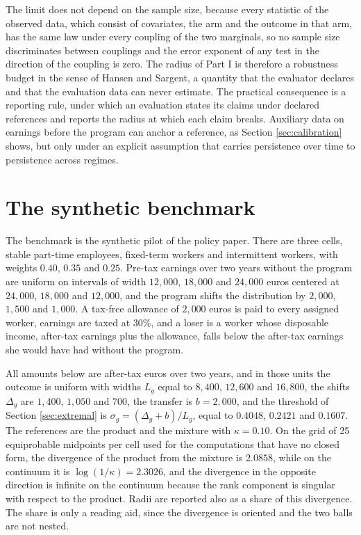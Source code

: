 \documentclass[11pt,a4paper]{article}
\theoremstyle{notesplain}
\theoremstyle{notesupright}
\numberwithin{equation}{section}
\begin{document}
The limit does not depend on the sample size, because every statistic of the observed data, which consist of covariates, the arm and the outcome in that arm, has the same law under every coupling of the two marginals, so no sample size discriminates between couplings and the error exponent of any test in the direction of the coupling is zero. The radius of Part I is therefore a robustness budget in the sense of Hansen and Sargent, a quantity that the evaluator declares and that the evaluation data can never estimate. The practical consequence is a reporting rule, under which an evaluation states its claims under declared references and reports the radius at which each claim breaks. Auxiliary data on earnings before the program can anchor a reference, as Section \ref{sec:calibration} shows, but only under an explicit assumption that carries persistence over time to persistence across regimes.

\section{The synthetic benchmark}
\label{sec:benchmark}
The benchmark is the synthetic pilot of the policy paper. There are three cells, stable part-time employees, fixed-term workers and intermittent workers, with weights $0.40$, $0.35$ and $0.25$. Pre-tax earnings over two years without the program are uniform on intervals of width $12{,}000$, $18{,}000$ and $24{,}000$ euros centered at $24{,}000$, $18{,}000$ and $12{,}000$, and the program shifts the distribution by $2{,}000$, $1{,}500$ and $1{,}000$. A tax-free allowance of $2{,}000$ euros is paid to every assigned worker, earnings are taxed at 30\%, and a loser is a worker whose disposable income, after-tax earnings plus the allowance, falls below the after-tax earnings she would have had without the program.

All amounts below are after-tax euros over two years, and in those units the outcome is uniform with widths $L_g$ equal to $8{,}400$, $12{,}600$ and $16{,}800$, the shifts $\Delta_g$ are $1{,}400$, $1{,}050$ and $700$, the transfer is $b=2{,}000$, and the threshold of Section \ref{sec:extremal} is $\sigma_g=(\Delta_g+b)/L_g$, equal to $0.4048$, $0.2421$ and $0.1607$. The references are the product and the mixture with $\kappa=0.10$. On the grid of 25 equiprobable midpoints per cell used for the computations that have no closed form, the divergence of the product from the mixture is $2.0858$, while on the continuum it is $\log(1/\kappa)=2.3026$, and the divergence in the opposite direction is infinite on the continuum because the rank component is singular with respect to the product. Radii are reported also as a share of this divergence. The share is only a reading aid, since the divergence is oriented and the two balls are not nested.
\end{document}
